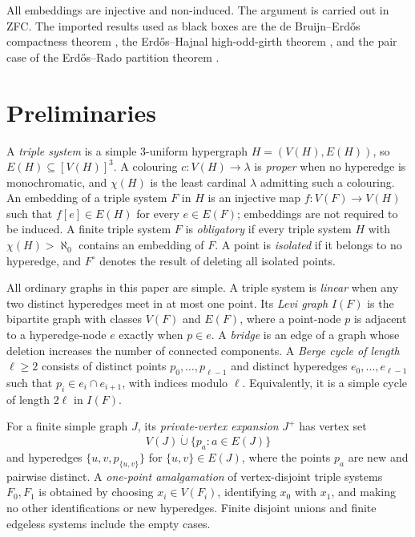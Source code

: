 \documentclass[a4paper,11pt,reqno]{amsart}
\theoremstyle{plain}
\theoremstyle{definition}
\theoremstyle{remark}
\begin{document}
All embeddings are injective and non-induced.  The argument is carried out
in ZFC.  The imported results used as black boxes are the de Bruijn--Erdős
compactness theorem \citep[Theorem~1, pp.~371--373]{debruijn1951}, the
Erdős--Hajnal high-odd-girth theorem
\citep[Theorem~7.4, p.~76]{erdoshajnal1966}, and the pair case of the
Erdős--Rado partition theorem
\citep[Theorem~4(i), formula~(95), p.~471]{erdosrado1956}.

\section{Preliminaries}\label{conventions-and-definitions}

A \emph{triple system} is a simple \(3\)-uniform hypergraph \(H=(V(H),E(H))\), so \(E(H)\subseteq[V(H)]^3\). A colouring \(c:V(H)\to\lambda\) is \emph{proper} when no hyperedge is monochromatic, and \(\chi(H)\) is the least cardinal \(\lambda\) admitting such a colouring. An embedding of a triple system \(F\) in \(H\) is an injective map \(f:V(F)\to V(H)\) such that \(f[e]\in E(H)\) for every \(e\in E(F)\); embeddings are not required to be induced. A finite triple system \(F\) is \emph{obligatory} if every triple system \(H\) with \(\chi(H)>\aleph_0\) contains an embedding of \(F\). A point is \emph{isolated} if it belongs to no hyperedge, and \(F^\circ\) denotes the result of deleting all isolated points.

All ordinary graphs in this paper are simple. A triple system is \emph{linear} when any two distinct hyperedges meet in at most one point. Its \emph{Levi graph} \(I(F)\) is the bipartite graph with classes \(V(F)\) and \(E(F)\), where a point-node \(p\) is adjacent to a hyperedge-node \(e\) exactly when \(p\in e\). A \emph{bridge} is an edge of a graph whose deletion increases the number of connected components. A \emph{Berge cycle of length} \(\ell\ge2\) consists of distinct points \(p_0,\ldots,p_{\ell-1}\) and distinct hyperedges \(e_0,\ldots,e_{\ell-1}\) such that \(p_i\in e_i\cap e_{i+1}\), with indices modulo \(\ell\). Equivalently, it is a simple cycle of length \(2\ell\) in \(I(F)\).

For a finite simple graph \(J\), its \emph{private-vertex expansion} \(J^+\) has vertex set
\[
V(J)\mathbin{\dot\cup}\{p_a:a\in E(J)\}
\]
and hyperedges \(\{u,v,p_{\{u,v\}}\}\) for \(\{u,v\}\in E(J)\), where the points \(p_a\) are new and pairwise distinct. A \emph{one-point amalgamation} of vertex-disjoint triple systems \(F_0,F_1\) is obtained by choosing \(x_i\in V(F_i)\), identifying \(x_0\) with \(x_1\), and making no other identifications or new hyperedges. Finite disjoint unions and finite edgeless systems include the empty cases.
\end{document}
